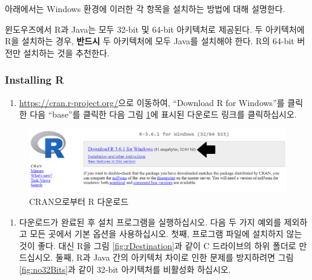 \documentclass[11pt]{book}
\providecommand{\tightlist}{%
  \setlength{\itemsep}{0pt}\setlength{\parskip}{0pt}}
\theoremstyle{definition}
\theoremstyle{definition}
\theoremstyle{definition}
\theoremstyle{remark}
\let\BeginKnitrBlock\begin \let\EndKnitrBlock\end
\begin{document}
아래에서는 Windows 환경에 이러한 각 항목을 설치하는 방법에 대해
설명한다.

\BeginKnitrBlock{rmdimportant}
윈도우즈에서 R과 Java는 모두 32-bit 및 64-bit 아키텍처로 제공된다. 두
아키텍처에 R을 설치하는 경우, \textbf{반드시} 두 아키텍처에 모두 Java를
설치해야 한다. R의 64-bit 버전만 설치하는 것을 추천한다.
\EndKnitrBlock{rmdimportant}

\subsubsection*{Installing R}\label{installing-r}

\begin{enumerate}
\def\labelenumi{\arabic{enumi}.}
\tightlist
\item
  \url{https://cran.r-project.org/}으로 이동하여, ``Download R for
  Windows''를 클릭한 다음 ``base''를 클릭한 다음 그림
  \ref{fig:downloadR}에 표시된 다운로드 링크를 클릭하십시오.
\end{enumerate}

\begin{figure}

{\centering \includegraphics[width=1\linewidth]{images/OhdsiAnalyticsTools/downloadR} 

}

\caption{CRAN으로부터 R 다운로드}\label{fig:downloadR}
\end{figure}

\begin{enumerate}
\def\labelenumi{\arabic{enumi}.}
\setcounter{enumi}{1}
\tightlist
\item
  다운로드가 완료된 후 설치 프로그램을 실행하십시오. 다음 두 가지 예외를
  제외하고 모든 곳에서 기본 옵션을 사용하십시오. 첫째, 프로그램 파일에
  설치하지 않는 것이 좋다. 대신 R을 그림 \ref{fig:rDestination}과 같이 C
  드라이브의 하위 폴더로 만드십시오. 둘째, R과 Java 간의 아키텍처 차이로
  인한 문제를 방지하려면 그림 \ref{fig:no32Bits}과 같이 32-bit
  아키텍처를 비활성화 하십시오.
\end{enumerate}
\end{document}
